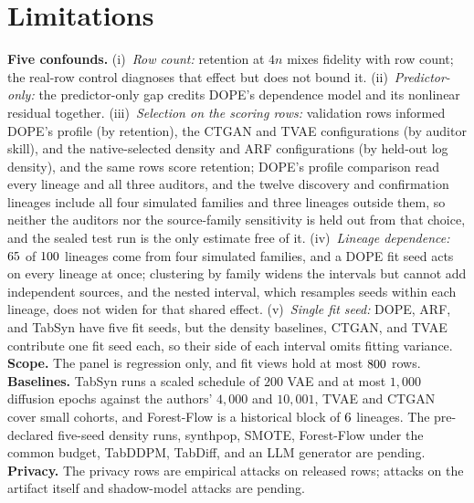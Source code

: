 \documentclass{article} %
\begin{document}
\section{Limitations}
\label{sec:threats}
\textbf{Five confounds.} (i)~\emph{Row count:} retention at $4n$ mixes fidelity with row count; the real-row control diagnoses that effect but does not bound it. (ii)~\emph{Predictor-only:} the predictor-only gap credits DOPE's dependence model and its nonlinear residual together. (iii)~\emph{Selection on the scoring rows:} validation rows informed DOPE's profile (by retention), the CTGAN and TVAE configurations (by auditor skill), and the native-selected density and ARF configurations (by held-out log density), and the same rows score retention; DOPE's profile comparison read every lineage and all three auditors, and the twelve discovery and confirmation lineages include all four simulated families and three lineages outside them, so neither the auditors nor the source-family sensitivity is held out from that choice, and the sealed test run is the only estimate free of it. (iv)~\emph{Lineage dependence:} $65$ of $100$ lineages come from four simulated families, and a DOPE fit seed acts on every lineage at once; clustering by family widens the intervals but cannot add independent sources, and the nested interval, which resamples seeds within each lineage, does not widen for that shared effect. (v)~\emph{Single fit seed:} DOPE, ARF, and TabSyn have five fit seeds, but the density baselines, CTGAN, and TVAE contribute one fit seed each, so their side of each interval omits fitting variance. \textbf{Scope.} The panel is regression only, and fit views hold at most $800$ rows. \textbf{Baselines.} TabSyn runs a scaled schedule of $200$ VAE and at most $1{,}000$ diffusion epochs against the authors' $4{,}000$ and $10{,}001$, TVAE and CTGAN cover small cohorts, and Forest-Flow is a historical block of $6$ lineages. The pre-declared five-seed density runs, synthpop, SMOTE, Forest-Flow under the common budget, TabDDPM, TabDiff, and an LLM generator are pending. \textbf{Privacy.} The privacy rows are empirical attacks on released rows; attacks on the artifact itself and shadow-model attacks are pending.
\end{document}
